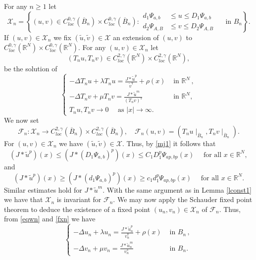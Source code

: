 \documentclass[leqno,12pt]{article}
\newcommand{\R}{\mathbb R}
\numberwithin{equation}{section}
\begin{document}
For any $n\geq 1$ let
\begin{equation}\label{eqsetn}
\mathscr{X}_n=\left\{(u,v)\in C^{0,\gamma}_{loc}(\overline B_n) \times C^{0,\gamma}_{loc}(\overline B_n): 
\begin{aligned}
d_1 \Psi_{a,b} & \leq u\leq  D_1 \Psi_{a,b}\\
d_2 \Psi_{A,B} & \leq v\leq  D_2 \Psi_{A,B}
\end{aligned} \quad\mbox{ in } B_n \right\}.
\end{equation}
If $(u,v)\in \mathscr{X}_n$ we fix $(\widetilde u, \widetilde v)\in \mathscr{X}$ an extension of $(u,v)$ to $C^{0,\gamma}_{loc}(\R^N)\times C^{0,\gamma}_{loc}(\R^N)$. 
For any $(u,v)\in \mathscr{X}_n$ let 
$$
(T_nu, T_nv)\in C^{2,\gamma}_{loc}(\R^N)\times C^{2,\gamma}_{loc}(\R^N),
$$ 
be the solution of 
\begin{equation}\label{eqwn}
\begin{cases}
\displaystyle   -\Delta T_nu+\lambda T_nu=\frac{J * \widetilde u^p}{\widetilde v^q}+\rho(x) &\mbox{ in }\R^N\, ,\\[0.1in]
\displaystyle   -\Delta T_nv+\mu T_nv=\frac{J * \widetilde u^m}{(T_nv)^s} &\mbox{ in }\R^N,\\[0.1in]
T_nu, T_nv\to 0\quad \mbox{ as } |x|\to \infty.&
\end{cases}
\end{equation}
We now set
\begin{equation}\label{fxn}
\mathscr{F}_n:\mathscr{X}_n\to C^{2,\gamma}_{loc}(\overline B_n)\times C^{2,\gamma}_{loc}(\overline B_n),\quad \mathscr{F}_n(u,v)=(T_nu\mid_{\overline B_n}, T_nv\mid_{\overline B_n}).
\end{equation}
For $(u,v)\in \mathscr{X}_n$ we have $(\tilde u, \tilde v)\in \mathscr{X}$. Thus,  by \eqref{mj1} it follows that 
$$
(J * \widetilde u^p)(x)\leq (J * (D_1\Psi_{a,b})^p)(x)\leq C_1D_1^p\Psi_{ap, bp}(x)\quad\mbox{ for all }x\in \R^N,
$$
and 
$$
(J * \widetilde u^p)(x)\geq (J * (d_1\Psi_{a,b})^p)(x)\geq c_1d_1^p\Psi_{ap, bp}(x)\quad\mbox{ for all }x\in \R^N.
$$
Similar estimates hold for $J*\widetilde u^m$. 
With the same argument as in Lemma \ref{lconst1} we have that $\mathscr{X}_n$ is invariant for $\mathscr{F}_n$. We may now apply the Schauder fixed point theorem to deduce the existence of a fixed point $(u_n, v_n)\in \mathscr{X}_n$ of $\mathscr{F}_n$. Thus, from \eqref{eqwn} and \eqref{fxn} we have
\begin{equation}\label{eqwnn}
\begin{cases}
\displaystyle   -\Delta u_n+\lambda u_n=\frac{J * \widetilde u_n^p}{v_n^q}+\rho(x) &\mbox{ in }B_n\, ,\\[0.1in]
\displaystyle   -\Delta v_n+\mu v_n=\frac{J * \widetilde u_n^m}{v_n^s} &\mbox{ in }B_n. 
\end{cases}
\end{equation}
\end{document}
